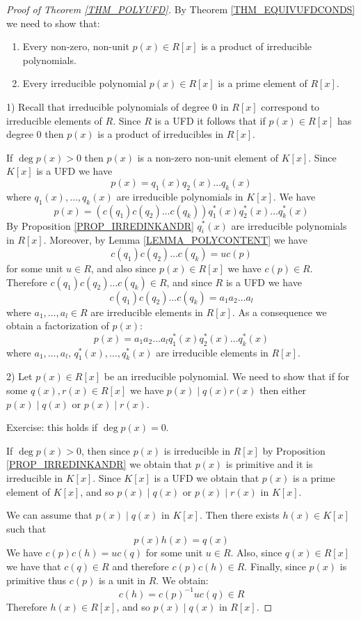 \documentclass[12pt, letterpaper, oneside]{article}
\theoremstyle{plain}
\theoremstyle{definition}
\newcommand{\benu}{\begin{enumerate}}
\newcommand{\eenu}{\end{enumerate}}
\newcommand{\vs}{\vskip 5mm}
\begin{document}
 
 \vs\vs
 
 
 \begin{proof}[Proof of Theorem \ref{THM_POLYUFD}]
 By Theorem \ref{THM_EQUIVUFDCONDS} we need to show that:
 
 \vskip -13mm
 
 \benu
 \item Every non-zero, non-unit $p(x)\in R[x]$ is a product of irreducible polynomials. 

 \item Every irreducible polynomial $p(x)\in R[x]$ is a prime element of $R[x]$.
 \eenu
 
 
 
 \vs
 
 1)  Recall that irreducible polynomials of degree $0$ in $R[x]$ correspond to irreducible elements 
 of $R$. Since $R$ is a UFD it follows that if $p(x)\in R[x]$ has degree $0$ then $p(x)$ is a product 
 of irreducibles in $R[x]$. 
 
 If $\deg p(x) >0 $ then $p(x)$ is a non-zero non-unit element of $K[x]$. Since $K[x]$ is a UFD we have 
 $$p(x) = q_{1}(x)q_{2}(x){\dots} q_{k}(x)$$
 where $q_{1}(x), \dots, q_{k}(x)$ are irreducible polynomials in $K[x]$. 
 We have
 $$p(x) = (c(q_{1})c(q_{2}){\dots}c(q_{k}))q^{\ast}_{1}(x)q^{\ast}_{2}(x){\dots}q^{\ast}_{k}(x)$$ 
 By Proposition \ref{PROP_IRREDINKANDR} $q^{\ast}_{i}(x)$ are irreducible polynomials in $R[x]$. 
 Moreover, by  Lemma \ref{LEMMA_POLYCONTENT} we have 
 $$c(q_{1})c(q_{2}){\dots}c(q_{k}) = uc(p)$$
 for some unit $u\in R$, and also since $p(x)\in R[x]$ we have $c(p)\in R$. Therefore 
 $c(q_{1})c(q_{2}){\dots}c(q_{k})\in R$, and since $R$ is a UFD we have 
 $$c(q_{1})c(q_{2}){\dots}c(q_{k}) = a_{1}a_{2}{\dots}a_{l}$$
 where $a_{1}, \dots, a_{l}\in R$ are irreducible elements in $R[x]$. As a consequence we
 obtain a factorization of $p(x)$:
 $$p(x) = a_{1}a_{2}{\dots}a_{l}q^{\ast}_{1}(x)q^{\ast}_{2}(x){\dots}q^{\ast}_{k}(x)$$
 where $a_{1}, \dots, a_{l}$, $q^{\ast}_{1}(x), \dots, q^{\ast}_{k}(x)$ are irreducible elements 
 in $R[x]$.
 
 
 \vs
 
 2) Let $p(x)\in R[x]$ be an irreducible polynomial. We need to show that if for some $q(x), r(x)\in R[x]$
 we have $p(x) \mid q(x)r(x)$ then either $p(x) \mid q(x)$ or $p(x) \mid r(x)$.
 
 Exercise: this holds if $\deg p(x) = 0$.
 
 
 If $\deg p(x) >0$, then since $p(x)$ is irreducible in $R[x]$ by Proposition \ref{PROP_IRREDINKANDR}
 we obtain that $p(x)$ is primitive and it is irreducible in $K[x]$. Since $K[x]$ is a UFD we obtain that 
 $p(x)$ is a prime element of $K[x]$, and so $p(x)\mid q(x)$ or $p(x) \mid r(x)$ in $K[x]$. 
 
 We can assume that $p(x) \mid q(x)$ in $K[x]$.  Then there exists $h(x)\in K[x]$ such that 
 $$p(x)h(x) = q(x)$$
 We have $c(p)c(h) = uc(q)$ for some unit $u\in R$. Also, since $q(x)\in R[x]$ we have that 
 $c(q)\in R$ and therefore $c(p)c(h)\in R$. Finally, since $p(x)$ is primitive thus $c(p)$ is a unit in $R$. 
 We obtain:
 $$c(h) = c(p)^{-1}uc(q)\in R$$
 Therefore $h(x)\in R[x]$, and so $p(x)\mid q(x)$ in $R[x]$.
 \end{proof}
 
\end{document}
